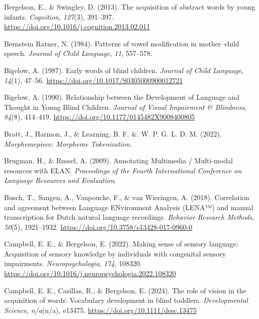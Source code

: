 \documentclass[
  man]{apa6}
\newlength{\cslhangindent}
\newlength{\cslentryspacingunit} %
\newenvironment{CSLReferences}[2] %
 {%
  \setlength{\parindent}{0pt}
  \ifodd #1
  \let\oldpar\par
  \def\par{\hangindent=\cslhangindent\oldpar}
  \fi
  \setlength{\parskip}{#2\cslentryspacingunit}
 }%
 {}
\begin{document}
\begin{CSLReferences}{1}{0}
\leavevmode{}%
Bergelson, E., \& Swingley, D. (2013). The acquisition of abstract words by young infants. \emph{Cognition}, \emph{127}(3), 391--397. \url{https://doi.org/10.1016/j.cognition.2013.02.011}

\leavevmode{}%
Bernstein Ratner, N. (1984). Patterns of vowel modification in mother--child speech. \emph{Journal of Child Language}, \emph{11}, 557--578.

\leavevmode{}%
Bigelow, A. (1987). Early words of blind children. \emph{Journal of Child Language}, \emph{14}(1), 47--56. \url{https://doi.org/10.1017/S0305000900012721}

\leavevmode{}%
Bigelow, A. (1990). Relationship between the {Development} of {Language} and {Thought} in {Young Blind Children}. \emph{Journal of Visual Impairment \& Blindness}, \emph{84}(8), 414--419. \url{https://doi.org/10.1177/0145482X9008400805}

\leavevmode{}%
Bratt, J., Harmon, J., \& Learning, B. F. \&. W. P. G. L. D. M. (2022). \emph{Morphemepiece: {Morpheme Tokenization}}.

\leavevmode{}%
Brugman, H., \& Russel, A. (2009). Annotating {Multimedia} / {Multi-modal} resources with {ELAN}. \emph{Proceedings of the Fourth International Conference on Language Resources and Evaluation}.

\leavevmode{}%
Busch, T., Sangen, A., Vanpoucke, F., \& van Wieringen, A. (2018). Correlation and agreement between {Language ENvironment Analysis} ({LENA}™) and manual transcription for {Dutch} natural language recordings. \emph{Behavior Research Methods}, \emph{50}(5), 1921--1932. \url{https://doi.org/10.3758/s13428-017-0960-0}

\leavevmode{}%
Campbell, E. E., \& Bergelson, E. (2022). Making sense of sensory language: {Acquisition} of sensory knowledge by individuals with congenital sensory impairments. \emph{Neuropsychologia}, \emph{174}, 108320. \url{https://doi.org/10.1016/j.neuropsychologia.2022.108320}

\leavevmode{}%
Campbell, E. E., Casillas, R., \& Bergelson, E. (2024). The role of vision in the acquisition of words: {Vocabulary} development in blind toddlers. \emph{Developmental Science}, \emph{n/a}(n/a), e13475. \url{https://doi.org/10.1111/desc.13475}


\end{CSLReferences}
\end{document}
